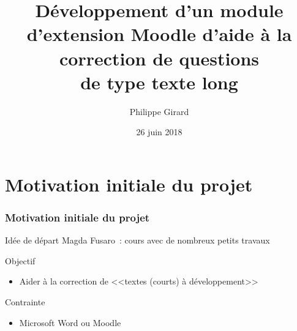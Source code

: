 \documentclass{beamer}
\title[Pr\'esentation du projet de ma\^itrise]{D\'eveloppement d'un module d'extension Moodle d'aide \`a la correction de questions\\de type \og texte long \fg{} }
\author{Philippe Girard}
\institute{Universit\'e du Qu\'ebec \`a Montr\'eal}
\date{26 juin 2018}
\begin{document}
  \begin{frame}[plain]
    \titlepage
  \end{frame}
  
  \begin{frame}[plain]
    \tableofcontents[hideallsubsections]
  \end{frame}
  
  \section[Introduction]{Motivation initiale du projet}
  \begin{frame}
    \frametitle{Motivation initiale du projet}

    \begin{block}{Id\'ee de d\'epart}
      Magda Fusaro~: cours avec de nombreux petits travaux 
    \end{block}

    \vfill

    \begin{block}{Objectif}
      \begin{itemize}
        \item Aider \`a la correction de <<textes (courts) \`a d\'eveloppement>>
      \end{itemize}
    \end{block}

    \vfill

    \begin{block}{Contrainte}
      \begin{itemize}
        \item Microsoft Word ou Moodle
      \end{itemize}
    \end{block}
    \vfill
  \end{frame}
  
\end{document}
